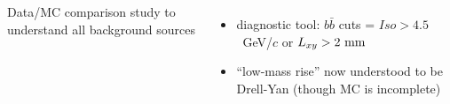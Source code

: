 \documentclass[compress]{beamer}
\begin{document}
\begin{frame}
\begin{columns}
Data/MC comparison study to understand all background sources
\begin{itemize}
\item diagnostic tool: $b\bar{b}$ cuts = $Iso > 4.5$~GeV/$c$ or $L_{xy} > \mbox{2 mm\hspace{-1 cm}}$
\item ``low-mass rise'' now understood to be Drell-Yan (though MC is incomplete)
\end{itemize}
\end{columns}

\begin{columns}


\end{columns}
\end{frame}
\end{document}
